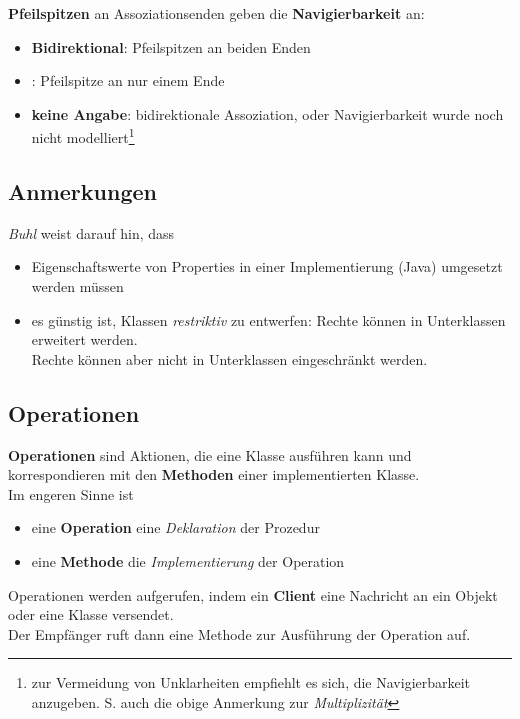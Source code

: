\noindent
\textbf{Pfeilspitzen} an Assoziationsenden geben die \textbf{Navigierbarkeit} an:

\begin{itemize}
    \item \textbf{Bidirektional}: Pfeilspitzen an beiden Enden
    \item {}: Pfeilspitze an nur einem Ende
    \item \textbf{keine Angabe}: bidirektionale Assoziation, oder Navigierbarkeit wurde noch nicht modelliert\footnote{
     zur Vermeidung von Unklarheiten empfiehlt es sich, die Navigierbarkeit anzugeben. S. auch die obige Anmerkung zur \textit{Multiplizität}
    }
\end{itemize}

\subsection*{Anmerkungen}
\textit{Buhl} weist darauf hin, dass

\begin{itemize}
    \item Eigenschaftswerte von Properties in einer Implementierung (Java) umgesetzt werden müssen
    \item es günstig ist, Klassen \textit{restriktiv} zu entwerfen: Rechte können in Unterklassen erweitert werden.\\
    Rechte können aber nicht in Unterklassen eingeschränkt werden.
\end{itemize}

\subsection{Operationen}

\textbf{Operationen} sind Aktionen, die eine Klasse ausführen kann und korrespondieren mit den \textbf{Methoden} einer implementierten Klasse.\\

\noindent
Im engeren Sinne ist
\begin{itemize}
    \item eine \textbf{Operation} eine \textit{Deklaration} der Prozedur
    \item eine \textbf{Methode} die \textit{Implementierung} der Operation
\end{itemize}

\noindent
Operationen werden aufgerufen, indem ein \textbf{Client} eine Nachricht an ein Objekt oder eine Klasse versendet.\\
Der Empfänger ruft dann eine Methode zur Ausführung der Operation auf.

